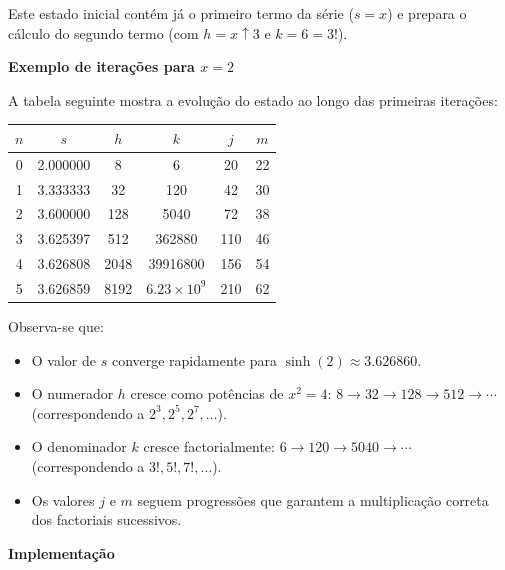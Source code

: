 \documentclass[11pt, a4paper, fleqn]{article}
\newcommand{\Varid}[1]{\mathit{#1}}
\begin{document}
Este estado inicial contém já o primeiro termo da série (\ensuremath{\Varid{s}\mathrel{=}\Varid{x}}) e prepara o cálculo do segundo termo
(com \ensuremath{\Varid{h}\mathrel{=}\Varid{x}\mathbin{\uparrow}\mathrm{3}} e \ensuremath{\Varid{k}\mathrel{=}\mathrm{6}\mathrel{=}\mathrm{3}\mathbin{!}}).

\textbf{Exemplo de iterações para $x = 2$}

A tabela seguinte mostra a evolução do estado ao longo das primeiras iterações:

\begin{center}
\begin{tabular}{cccccc}
\hline
$n$ & $s$ & $h$ & $k$ & $j$ & $m$ \\
\hline
0 & 2.000000 & 8 & 6 & 20 & 22 \\
1 & 3.333333 & 32 & 120 & 42 & 30 \\
2 & 3.600000 & 128 & 5040 & 72 & 38 \\
3 & 3.625397 & 512 & 362880 & 110 & 46 \\
4 & 3.626808 & 2048 & 39916800 & 156 & 54 \\
5 & 3.626859 & 8192 & $6.23 \times 10^9$ & 210 & 62 \\
\hline
\end{tabular}
\end{center}

Observa-se que:
\begin{itemize}
    \item O valor de $s$ converge rapidamente para $\sinh(2) \approx 3.626860$.
    \item O numerador $h$ cresce como potências de $x^2 = 4$: $8 \to 32 \to 128 \to 512 \to \cdots$ (correspondendo a $2^3, 2^5, 2^7, \ldots$).
    \item O denominador $k$ cresce factorialmente: $6 \to 120 \to 5040 \to \cdots$ (correspondendo a $3!, 5!, 7!, \ldots$).
    \item Os valores $j$ e $m$ seguem progressões que garantem a multiplicação correta dos factoriais sucessivos.
\end{itemize}

\textbf{Implementação}
\end{document}
